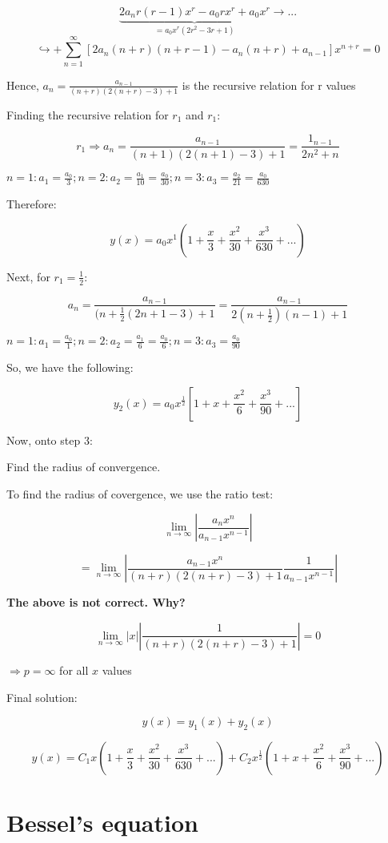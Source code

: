 \documentclass{article}
\begin{document}
$$\underbrace{2 a_n r(r-1)x^r - a_0 r x^r + a_0 x^r}_{ = a_0 x^r \left( 2r^2 - 3r + 1 \right)} \longrightarrow ...$$
$$\hookrightarrow + \sum_{n = 1}^\infty \left[ 2 a_n (n+r) (n+r-1) - a_n (n+r) + a_{n-1} \right] x^{n+r} = 0$$

Hence, $a_n = \frac{a_{n-1}}{(n+r)(2(n+r)-3) + 1}$ is the recursive relation for r values

Finding the recursive relation for $r_1$ and $r_1$:

$$r_1 \Rightarrow a_n = \frac{a_{n-1}}{(n+1)(2(n+1)-3)+1} = \frac{1_{n-1}}{2n^2 + n}$$

$n = 1: a_1 = \frac{a_0}{3}; n = 2: a_2 = \frac{a_1}{10} = \frac{a_0}{30}; n = 3: a_3 = \frac{a_2}{21} = \frac{a_0}{630}$

Therefore:

$$y(x) = a_0 x^1 (1 + \frac{x}{3} + \frac{x^2}{30} + \frac{x^3}{630} + ...)$$

Next, for $r_1 = \frac{1}{2}$:

$$a_n  =\frac{a_{n-1}}{(n + \frac{1}{2} (2n+1-3) + 1} = \frac{a_{n-1}}{2(n + \frac{1}{2})(n-1) + 1}$$

$n = 1: a_1 = \frac{a_0}{1}; n = 2:  a_2 = \frac{a_1}{6} = \frac{a_0}{6}; n = 3: a_3 = \frac{a_0}{90}$

So, we have the following:

$$y_2(x) = a_0 x^{\frac{1}{2}} \left[ 1 + x + \frac{x^2}{6} + \frac{x^3}{90} + ... \right]$$

Now, onto step 3:

Find the radius of convergence. 

To find the radius of covergence, we use the ratio test:

$$\lim_{n \to \infty} | \frac{a_n x^n}{a_{n-1}x^{n-1}}|$$

$$ = \lim_{n \to \infty} | \frac{a_{n-1} x^n}{(n+r) (2(n+r)-3) + 1} \frac{1}{a_{n-1} x^{n-1}} |$$

\textbf{The above is not correct. Why?}

$$\lim_{n \to \infty} |x| |\frac{1}{(n+r) (2(n+r)-3)+1}| = 0$$

$\Rightarrow p = \infty$ for all $x$ values

Final solution:

$$y(x) = y_1(x) + y_2(x)$$

$$y(x) = C_1 x \left(1 + \frac{x}{3} + \frac{x^2}{30} + \frac{x^3}{630} + ... \right) + C_2 x^\frac{1}{2} \left(1+x+\frac{x^2}{6} + \frac{x^3}{90} + ... \right)$$


\section{Bessel's equation}
\end{document}
